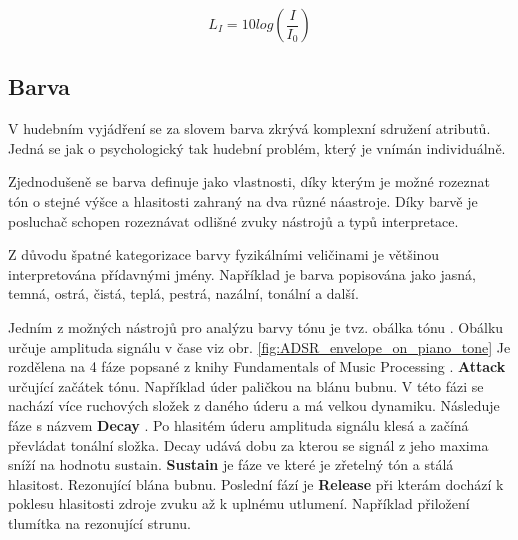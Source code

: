   \begin{equation}
    L_I = 10log(\frac{I}{I_0})
    \label{rov:hladina_intenzity}
  \end{equation}

  \subsection{Barva} \label{sec:Barva}

  V hudebním vyjádření se za slovem barva zkrývá komplexní sdružení atributů.
  Jedná se jak o psychologický tak hudební problém, který je vnímán individuálně\cite{The_perception_of_musical_timbre}.

  Zjednodušeně se barva definuje jako vlastnosti, díky kterým je možné rozeznat tón o stejné výšce a hlasitosti zahraný na dva různé náastroje\cite{MULLER2014713}.
  Díky barvě je posluchač schopen rozeznávat odlišné zvuky nástrojů a typů interpretace.

  Z důvodu špatné kategorizace barvy fyzikálními veličinami je většinou interpretována přídavnými jmény.
  Například je barva popisována jako jasná, temná, ostrá, čistá, teplá, pestrá, nazální, tonální a další.

  Jedním z možných nástrojů pro analýzu barvy tónu je tvz. obálka tónu .
  Obálku určuje amplituda signálu v čase viz obr. \ref{fig:ADSR_envelope_on_piano_tone}
  Je rozdělena na 4 fáze popsané z knihy Fundamentals of Music Processing \cite{fundamental_of_music_processing}.
  \textbf{Attack } určující začátek tónu. Například úder paličkou na blánu bubnu.
  V této fázi se nachází více ruchových složek z daného úderu a má velkou dynamiku.
  Následuje fáze s názvem \textbf{Decay }.
  Po hlasitém úderu amplituda signálu klesá a začíná převládat tonální složka. Decay udává dobu za kterou se signál z jeho maxima sníží na hodnotu sustain.
  \textbf{Sustain } je fáze ve které je zřetelný tón a stálá hlasitost. Rezonující blána bubnu.
  Poslední fází je \textbf{Release } při kterám dochází k poklesu hlasitosti zdroje zvuku až k uplnému utlumení.
  Například přiložení tlumítka na rezonující strunu.

